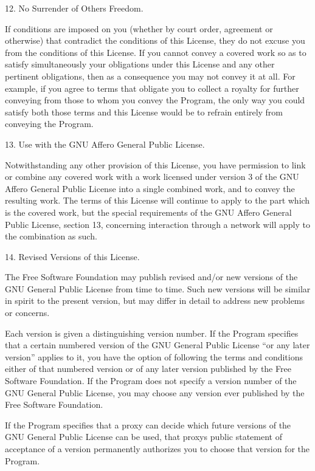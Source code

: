 \documentclass[letterpaper,10pt,english]{sphinxmanual}
\begin{document}
\begin{sphinxVerbatim}[commandchars=\\\{\}]
 12. No Surrender of Others\PYGZsq{} Freedom.

   If conditions are imposed on you (whether by court order, agreement or
   otherwise) that contradict the conditions of this License, they do not
   excuse you from the conditions of this License. If you cannot convey a
   covered work so as to satisfy simultaneously your obligations under this
   License and any other pertinent obligations, then as a consequence you may
   not convey it at all. For example, if you agree to terms that obligate you
   to collect a royalty for further conveying from those to whom you convey the
   Program, the only way you could satisfy both those terms and this License
   would be to refrain entirely from conveying the Program.

13. Use with the GNU Affero General Public License.

   Notwithstanding any other provision of this License, you have permission to
   link or combine any covered work with a work licensed under version 3 of the
   GNU Affero General Public License into a single combined work, and to convey
   the resulting work. The terms of this License will continue to apply to the
   part which is the covered work, but the special requirements of the GNU
   Affero General Public License, section 13, concerning interaction through a
   network will apply to the combination as such.

 14. Revised Versions of this License.

   The Free Software Foundation may publish revised and/or new versions of the
   GNU General Public License from time to time. Such new versions will be
   similar in spirit to the present version, but may differ in detail to
   address new problems or concerns.

   Each version is given a distinguishing version number. If the Program
   specifies that a certain numbered version of the GNU General Public License
   “or any later version” applies to it, you have the option of following the
   terms and conditions either of that numbered version or of any later version
   published by the Free Software Foundation. If the Program does not specify a
   version number of the GNU General Public License, you may choose any version
   ever published by the Free Software Foundation.

   If the Program specifies that a proxy can decide which future versions of
   the GNU General Public License can be used, that proxy\PYGZsq{}s public statement of
   acceptance of a version permanently authorizes you to choose that version
   for the Program.


\end{sphinxVerbatim}
\end{document}
